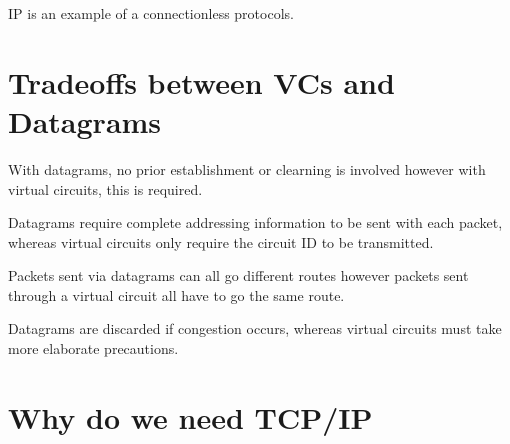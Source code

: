 IP is an example of a connectionless protocols. 

\section*{Tradeoffs between VCs and Datagrams}
With datagrams, no prior establishment or clearning is involved however with virtual circuits, this is required.

Datagrams require complete addressing information to be sent with each packet, whereas virtual circuits only require the circuit ID to be transmitted.

Packets sent via datagrams can all go different routes however packets sent through a virtual circuit all have to go the same route.

Datagrams are discarded if congestion occurs, whereas virtual circuits must take more elaborate precautions.

\section*{Why do we need TCP/IP}